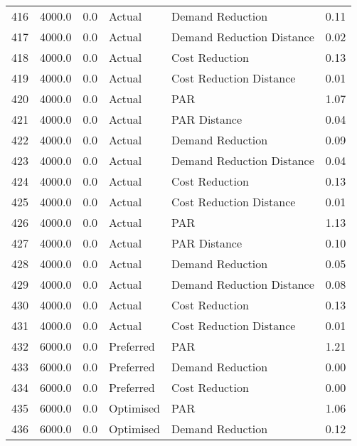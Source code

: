 \begin{longtable}{lrrllr}
416  &       4000.0 &     0.0 &         Actual &           Demand Reduction &   0.11 \\
417  &       4000.0 &     0.0 &         Actual &  Demand Reduction Distance &   0.02 \\
418  &       4000.0 &     0.0 &         Actual &             Cost Reduction &   0.13 \\
419  &       4000.0 &     0.0 &         Actual &    Cost Reduction Distance &   0.01 \\
420  &       4000.0 &     0.0 &         Actual &                        PAR &   1.07 \\
421  &       4000.0 &     0.0 &         Actual &               PAR Distance &   0.04 \\
422  &       4000.0 &     0.0 &         Actual &           Demand Reduction &   0.09 \\
423  &       4000.0 &     0.0 &         Actual &  Demand Reduction Distance &   0.04 \\
424  &       4000.0 &     0.0 &         Actual &             Cost Reduction &   0.13 \\
425  &       4000.0 &     0.0 &         Actual &    Cost Reduction Distance &   0.01 \\
426  &       4000.0 &     0.0 &         Actual &                        PAR &   1.13 \\
427  &       4000.0 &     0.0 &         Actual &               PAR Distance &   0.10 \\
428  &       4000.0 &     0.0 &         Actual &           Demand Reduction &   0.05 \\
429  &       4000.0 &     0.0 &         Actual &  Demand Reduction Distance &   0.08 \\
430  &       4000.0 &     0.0 &         Actual &             Cost Reduction &   0.13 \\
431  &       4000.0 &     0.0 &         Actual &    Cost Reduction Distance &   0.01 \\
432  &       6000.0 &     0.0 &      Preferred &                        PAR &   1.21 \\
433  &       6000.0 &     0.0 &      Preferred &           Demand Reduction &   0.00 \\
434  &       6000.0 &     0.0 &      Preferred &             Cost Reduction &   0.00 \\
435  &       6000.0 &     0.0 &      Optimised &                        PAR &   1.06 \\
436  &       6000.0 &     0.0 &      Optimised &           Demand Reduction &   0.12 \\

\end{longtable}
